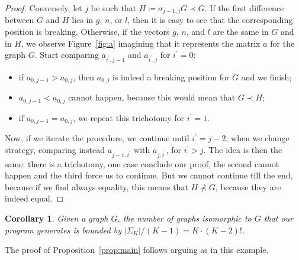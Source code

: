 \documentclass{amsart}
\theoremstyle{plain}
\newtheorem{corollary}[theorem]{Corollary}
\theoremstyle{definition}
\newcommand{\abs}[1]{\left|#1\right|}
\begin{document}
\begin{proof}
  Conversely, let $j$ be such that $H \coloneqq \sigma_{j-1,j} G \prec
  G$. If the first difference between $G$ and $H$ lies in $g$, $n$, or
  $l$, then it is easy to see that the corresponding position is
  breaking. Otherwise, if the vectors $g$, $n$, and $l$ are the same
  in $G$ and in $H$, we observe Figure~\ref{fig:a} imagining that it
  represents the matrix $a$ for the graph $G$. Start comparing
  $a_{i^\prime,j-1}$ and $a_{i^\prime,j}$ for $i^\prime = 0$:
  \begin{itemize}
  \item if $a_{0,j-1} > a_{0,j}$, then $a_{0,j}$ is indeed a breaking
    position for $G$ and we finish;
  \item $a_{0,j-1} < a_{0,j}$ cannot happen, because this would mean
    that $G \prec H$;
  \item if $a_{0,j-1} = a_{0,j}$, we repeat this trichotomy for
    $i^\prime = 1$.
  \end{itemize}
  Now, if we iterate the procedure, we continue until $i^\prime =
  j-2$, when we change strategy, comparing instead $a_{j-1,i^\prime}$
  with $a_{j,i^\prime}$, for $i^\prime > j$. The idea is then the
  same: there is a trichotomy, one case conclude our proof, the second
  cannot happen and the third force us to continue. But we cannot
  continue till the end, because if we find always equality, this
  means that $H \not\prec G$, because they are indeed equal.
\end{proof}

\begin{corollary}
  Given a graph $G$, the number of graphs isomorphic to $G$ that our
  program generates is bounded by $\abs{\Sigma_K}/(K-1) = K\cdot
  (K-2)!$.
 \end{corollary}

 The proof of Proposition~\ref{prop:main} follows arguing as in this
 example.
\end{document}
